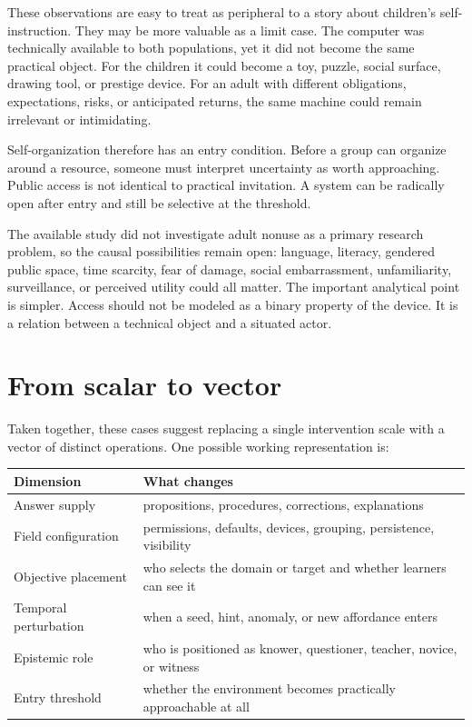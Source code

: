 \documentclass[11pt]{article}
\begin{document}
These observations are easy to treat as peripheral to a story about children's self-instruction. They may be more valuable as a limit case. The computer was technically available to both populations, yet it did not become the same practical object. For the children it could become a toy, puzzle, social surface, drawing tool, or prestige device. For an adult with different obligations, expectations, risks, or anticipated returns, the same machine could remain irrelevant or intimidating.

Self-organization therefore has an entry condition. Before a group can organize around a resource, someone must interpret uncertainty as worth approaching. Public access is not identical to practical invitation. A system can be radically open after entry and still be selective at the threshold.

The available study did not investigate adult nonuse as a primary research problem, so the causal possibilities remain open: language, literacy, gendered public space, time scarcity, fear of damage, social embarrassment, unfamiliarity, surveillance, or perceived utility could all matter. The important analytical point is simpler. Access should not be modeled as a binary property of the device. It is a relation between a technical object and a situated actor.

\section{From scalar to vector}
Taken together, these cases suggest replacing a single intervention scale with a vector of distinct operations. One possible working representation is:

\begin{center}
\begin{tabular}{>{\raggedright\arraybackslash}p{} p{}}
\toprule
\textbf{Dimension} & \textbf{What changes} \\
\midrule
Answer supply & propositions, procedures, corrections, explanations \\
Field configuration & permissions, defaults, devices, grouping, persistence, visibility \\
Objective placement & who selects the domain or target and whether learners can see it \\
Temporal perturbation & when a seed, hint, anomaly, or new affordance enters \\
Epistemic role & who is positioned as knower, questioner, teacher, novice, or witness \\
Entry threshold & whether the environment becomes practically approachable at all \\
\bottomrule
\end{tabular}
\end{center}
\end{document}
